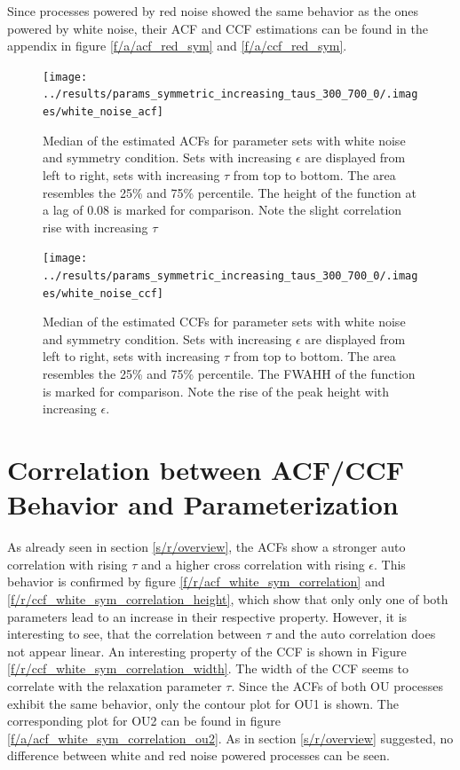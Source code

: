 \documentclass[a4paper,12pt]{book}
\theoremstyle{break}
\begin{document}
Since processes powered by red noise showed the same behavior as the ones powered by white noise, their ACF and CCF estimations can be found in the appendix in figure \ref{f/a/acf_red_sym} and \ref{f/a/ccf_red_sym}.

\begin{figure}[htp]
	\texttt{[image: ../results/params\_symmetric\_increasing\_taus\_300\_700\_0/.images/white\_noise\_acf]}%
	\caption{Median of the estimated ACFs for parameter sets with white noise and symmetry condition. Sets with increasing $\epsilon$ are displayed from left to right, sets with increasing $\tau$ from top to bottom. The area resembles the 25\% and 75\% percentile. The height of the function at a lag of 0.08 is marked for comparison. Note the slight correlation rise with increasing $\tau$ }%
	\label{f/r/acf_white_sym}%
\end{figure}

\begin{figure}[htp]
	\texttt{[image: ../results/params\_symmetric\_increasing\_taus\_300\_700\_0/.images/white\_noise\_ccf]}%
	\caption{Median of the estimated CCFs for parameter sets with white noise and symmetry condition. Sets with increasing $\epsilon$ are displayed from left to right, sets with increasing $\tau$ from top to bottom. The area resembles the 25\% and 75\% percentile. The \ac{FWAHH} of the function is marked for comparison. Note the rise of the peak height with increasing $\epsilon$. }%
	\label{f/r/ccf_white_sym}
\end{figure}


\section{Correlation between ACF/CCF Behavior and Parameterization}\label{s/r/correlation_sym}
As already seen in section \ref{s/r/overview}, the ACFs show a stronger auto correlation with rising $\tau$ and a higher cross correlation with rising $\epsilon$. This behavior is confirmed by figure \ref{f/r/acf_white_sym_correlation} and \ref{f/r/ccf_white_sym_correlation_height}, which show that only only one of both parameters lead to an increase in their respective property.
However, it is interesting to see, that the correlation between $\tau$ and the auto correlation does not appear linear.
An interesting property of the CCF is shown in Figure \ref{f/r/ccf_white_sym_correlation_width}. The width of the CCF seems to correlate with the relaxation parameter $\tau$.
Since the ACFs of both OU processes exhibit the same behavior, only the contour plot for OU1 is shown. The corresponding plot for OU2 can be found in figure \ref{f/a/acf_white_sym_correlation_ou2}.
As in section \ref{s/r/overview} suggested, no difference between white and red  noise powered processes  can be seen.
\end{document}
